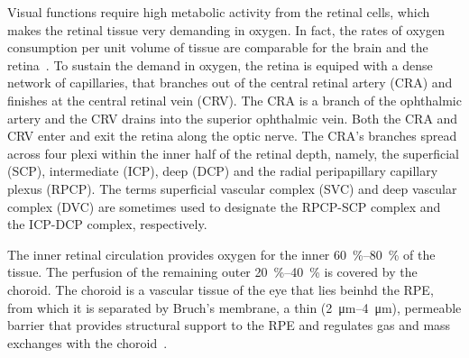 \documentclass[12pt,a4paper]{journal}
\begin{document}
Visual functions require high metabolic activity from the retinal cells, which makes the retinal tissue very demanding in oxygen.
In fact, the rates of oxygen consumption per unit volume of tissue are comparable for the brain and the retina~\cite{Medrano_1995}.
To sustain the demand in oxygen, the retina is equiped with a dense network of capillaries, that branches out of the central retinal artery (CRA) and finishes at the central retinal vein (CRV).
The CRA is a branch of the ophthalmic artery and the CRV drains into the superior ophthalmic vein.
Both the CRA and CRV enter and exit the retina along the optic nerve.
The CRA's branches spread across four plexi within the inner half of the retinal depth, namely, the superficial (SCP), intermediate (ICP), deep (DCP) and the radial peripapillary capillary plexus (RPCP).
The terms superficial vascular complex (SVC) and deep vascular complex (DVC) are sometimes used to designate the RPCP-SCP complex and the ICP-DCP complex, respectively.

The inner retinal circulation provides oxygen for the inner \SIrange{60}{80}{\percent} of the tissue.
The perfusion of the remaining outer \SIrange{20}{40}{\percent} is covered by the choroid.
The choroid is a vascular tissue of the eye that lies beinhd the RPE, from which it is separated by Bruch's membrane, a thin (\SIrange{2}{4}{\micro\meter}), permeable barrier that provides structural support to the RPE and regulates gas and mass exchanges with the choroid~\cite{Curcio_2013}.
\end{document}
